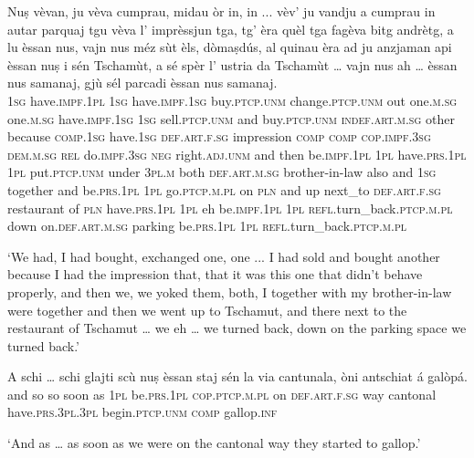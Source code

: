 \begin{linenumbers}
\gll Nuṣ vèvan, ju vèva cumprau, midau òr in, in ... vèv’ ju vandju a cumprau in autar parquaj tgu vèva l’ imprèssjun tga, tg’ èra quèl tga fagèva bitg andrètg, a lu èssan nus, vajn nus méz sùt èls, dòmaṣdús, al quinau èra ad ju anzjaman api èssan nuṣ i sén Tschamùt, a sé spèr l’ ustria da Tschamùt … vajn nus ah … èssan nus samanaj, gjù sél parcadi èssan nus samanaj.\\
 \textsc{1sg} have.\textsc{impf.1pl} \textsc{1sg} have.\textsc{impf.1sg} buy.\textsc{ptcp.unm} change.\textsc{ptcp.unm} out one.\textsc{m.sg} one.\textsc{m.sg} {} have.\textsc{impf.1sg} \textsc{1sg} sell.\textsc{ptcp.unm} and buy.\textsc{ptcp.unm} \textsc{indef.art.m.sg} other because \textsc{comp.1sg} have.\textsc{1sg} \textsc{def.art.f.sg} impression \textsc{comp}  \textsc{comp} \textsc{cop.impf.3sg} \textsc{dem.m.sg} \textsc{rel} do.\textsc{impf.3sg} \textsc{neg} right.\textsc{adj.unm} and then be.\textsc{impf.1pl} \textsc{1pl} have.\textsc{prs.1pl}  \textsc{1pl} put.\textsc{ptcp.unm} under \textsc{3pl.m} both \textsc{def.art.m.sg} brother-in-law also and \textsc{1sg} together and be.\textsc{prs.1pl} \textsc{1pl} go.\textsc{ptcp.m.pl} on \textsc{pln} and up next\_to \textsc{def.art.f.sg} restaurant of \textsc{pln} {} have.\textsc{prs.1pl} \textsc{1pl} eh {} be.\textsc{impf.1pl} \textsc{1pl} \textsc{refl.}turn\_back.\textsc{ptcp.m.pl} down on.\textsc{def.art.m.sg} parking be.\textsc{prs.1pl} \textsc{1pl} \textsc{refl.}turn\_back.\textsc{ptcp.m.pl}\\
\end{linenumbers}
\medskip
\glt `We had, I had bought, exchanged one, one ... I had sold and bought another because I had the impression that, that it was this one that didn’t behave properly, and then we, we yoked them, both, I together with my brother-in-law were together and then we went up to Tschamut, and there next to the restaurant of Tschamut … we eh … we turned back, down on the parking space we turned back.'
\medskip

\begin{linenumbers}
\gll  A schi … schi glajti scù nuṣ èssan staj sén la via cantunala, òni antschiat á galòpá.  \\
and so {} so soon as \textsc{1pl} be.\textsc{prs.1pl} \textsc{cop.ptcp.m.pl} on \textsc{def.art.f.sg} way cantonal have.\textsc{prs.3pl.3pl} begin.\textsc{ptcp.unm} \textsc{comp} gallop.\textsc{inf}\\
\end{linenumbers}
\medskip
\glt `And as … as soon as we were on the cantonal way they started to gallop.'
\medskip

